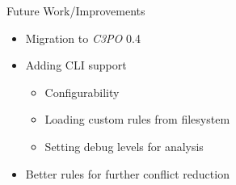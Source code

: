 \documentclass{beamer}
\begin{document}
\begin{frame}{Future Work/Improvements}

\begin{itemize}
 \item Migration to \emph{C3PO} 0.4
 \item Adding CLI support
    \begin{itemize}
     \item Configurability
     \item Loading custom rules from filesystem
     \item Setting debug levels for analysis
    \end{itemize}
 \item Better rules for further conflict reduction
\end{itemize}


\end{frame}
\end{document}
